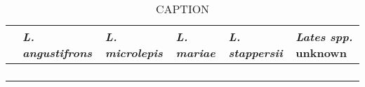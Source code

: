 \begin{table}[ht]
\centering
\caption{CAPTION}
\begin{tabular}{@{}llllll@{}}
\toprule
  & \textit{L. angustifrons} & \textit{L. microlepis} & \textit{L. mariae} & \textit{L. stappersii} & \textit{Lates spp.} unknown \\ \midrule
 &   &    &    &  &  \\
 &   &    &    &  &  \\
 &   &    &    &  &  \\ \bottomrule
 &  &  &  &  &
\end{tabular}
\end{table}